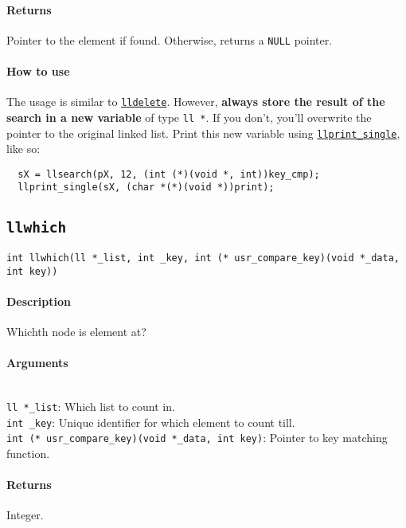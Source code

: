 \documentclass{article}
\begin{document}
\paragraph{Returns}

Pointer to the element if found. Otherwise, returns a \texttt{\texttt{NULL}} pointer.

\paragraph{How to use}

The usage is similar to \hyperref[lldelete]{\texttt{lldelete}}. However, \textbf{always store the result of
the search in a new variable} of type \texttt{ll *}. If you don't, you'll overwrite the pointer to
the original linked list. Print this new variable using
\hyperref[llprintsingle]{\texttt{llprint\_single}}, like so:\\[8pt]
\begin{verbatim}
  sX = llsearch(pX, 12, (int (*)(void *, int))key_cmp);
  llprint_single(sX, (char *(*)(void *))print);
\end{verbatim}

\subsection{\texttt{llwhich}}

\verb|int llwhich(ll *_list, int _key, int (* usr_compare_key)(void *_data, int key))|

\paragraph{Description}
Whichth node is element at?

\paragraph{Arguments}
\verb| |\\
\verb|ll *_list|: Which list to count in.\\
\verb|int _key|: Unique identifier for which element to count till.\\
\verb|int (* usr_compare_key)(void *_data, int key)|: Pointer to key matching function.

\paragraph{Returns}
Integer.
\end{document}
